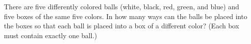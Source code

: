 There are five differently colored balls (white, black, red, green, and blue) and five boxes of the same five colors. In how many ways can the balls be placed into the boxes so that each ball is placed into a box of a different color? (Each box must contain exactly one ball.)
